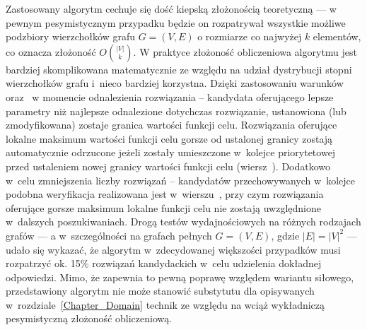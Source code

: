 {  Zastosowany algorytm cechuje się dość kiepską złożonością teoretyczną --- w pewnym pesymistycznym przypadku będzie on rozpatrywał wszystkie możliwe podzbiory wierzchołków grafu $G=(V, E)$ o rozmiarze co najwyżej $k$ elementów, co oznacza złożoność $O{|V| \choose k}$.
  W praktyce złożoność obliczeniowa algorytmu jest bardziej skomplikowana matematycznie ze względu na udział dystrybucji stopni wierzchołków grafu i~nieco bardziej korzystna.
  Dzięki zastosowaniu warunków~ oraz~ w momencie odnalezienia rozwiązania -- kandydata oferującego lepsze parametry niż najlepsze odnalezione dotychczas rozwiązanie, ustanowiona (lub zmodyfikowana) zostaje granica wartości funkcji celu.
  Rozwiązania oferujące lokalne maksimum wartości funkcji celu gorsze od ustalonej granicy zostają automatycznie odrzucone jeżeli zostały umieszczone w~kolejce priorytetowej przed ustaleniem nowej granicy wartości funkcji celu (wiersz~).
  Dodatkowo w~celu zmniejszenia liczby rozwiązań -- kandydatów przechowywanych w~kolejce podobna weryfikacja realizowana jest w~wierszu~, przy czym rozwiązania oferujące gorsze maksimum lokalne funkcji celu nie zostają uwzględnione w~dalszych poszukiwaniach.
  Drogą testów wydajnościowych na różnych rodzajach grafów --- a w~szczególności na grafach pełnych $G=(V, E)$, gdzie $|E|=|V|^2$ --- udało się wykazać, że algorytm w~zdecydowanej większości przypadków musi rozpatrzyć ok. 15\% rozwiązań kandydackich w~celu udzielenia dokładnej odpowiedzi.
  Mimo, że zapewnia to pewną poprawę względem wariantu siłowego, przedstawiony algorytm nie może stanowić substytutu dla opisywanych w~rozdziale~\ref{Chapter_Domain} technik ze względu na wciąż wykładniczą pesymistyczną złożoność obliczeniową.
}